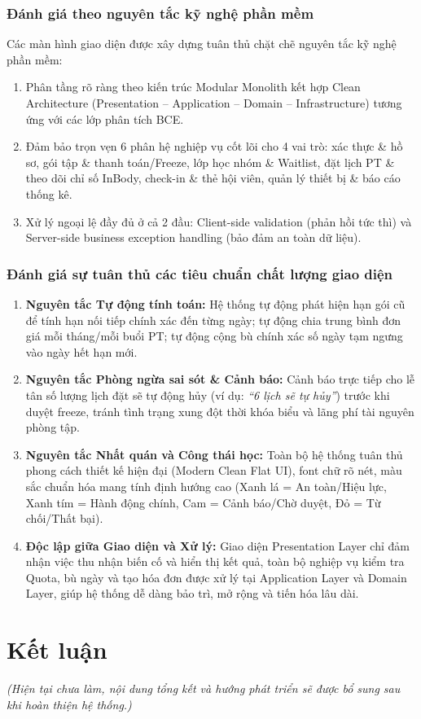 \documentclass[a4paper,12pt]{article}
\begin{document}
\subsubsection{Đánh giá theo nguyên tắc kỹ nghệ phần mềm}
Các màn hình giao diện được xây dựng tuân thủ chặt chẽ nguyên tắc kỹ nghệ phần mềm:
\begin{enumerate}
    \item Phân tầng rõ ràng theo kiến trúc Modular Monolith kết hợp Clean Architecture (Presentation -- Application -- Domain -- Infrastructure) tương ứng với các lớp phân tích BCE.
    \item Đảm bảo trọn vẹn 6 phân hệ nghiệp vụ cốt lõi cho 4 vai trò: xác thực \& hồ sơ, gói tập \& thanh toán/Freeze, lớp học nhóm \& Waitlist, đặt lịch PT \& theo dõi chỉ số InBody, check-in \& thẻ hội viên, quản lý thiết bị \& báo cáo thống kê.
    \item Xử lý ngoại lệ đầy đủ ở cả 2 đầu: Client-side validation (phản hồi tức thì) và Server-side business exception handling (bảo đảm an toàn dữ liệu).
\end{enumerate}

\subsubsection{Đánh giá sự tuân thủ các tiêu chuẩn chất lượng giao diện}
\begin{enumerate}
    \item \textbf{Nguyên tắc Tự động tính toán:} 
    Hệ thống tự động phát hiện hạn gói cũ để tính hạn nối tiếp chính xác đến từng ngày; tự động chia trung bình đơn giá mỗi tháng/mỗi buổi PT; tự động cộng bù chính xác số ngày tạm ngưng vào ngày hết hạn mới.
    \item \textbf{Nguyên tắc Phòng ngừa sai sót \& Cảnh báo:}
    Cảnh báo trực tiếp cho lễ tân số lượng lịch đặt sẽ tự động hủy (ví dụ: \textit{``6 lịch sẽ tự hủy''}) trước khi duyệt freeze, tránh tình trạng xung đột thời khóa biểu và lãng phí tài nguyên phòng tập.
    \item \textbf{Nguyên tắc Nhất quán và Công thái học:}
    Toàn bộ hệ thống tuân thủ phong cách thiết kế hiện đại (Modern Clean Flat UI), font chữ rõ nét, màu sắc chuẩn hóa mang tính định hướng cao (Xanh lá = An toàn/Hiệu lực, Xanh tím = Hành động chính, Cam = Cảnh báo/Chờ duyệt, Đỏ = Từ chối/Thất bại).
    \item \textbf{Độc lập giữa Giao diện và Xử lý:}
    Giao diện Presentation Layer chỉ đảm nhận việc thu nhận biến cố và hiển thị kết quả, toàn bộ nghiệp vụ kiểm tra Quota, bù ngày và tạo hóa đơn được xử lý tại Application Layer và Domain Layer, giúp hệ thống dễ dàng bảo trì, mở rộng và tiến hóa lâu dài.
\end{enumerate}


\newpage
\section{Kết luận}
\textit{(Hiện tại chưa làm, nội dung tổng kết và hướng phát triển sẽ được bổ sung sau khi hoàn thiện hệ thống.)}
\end{document}

